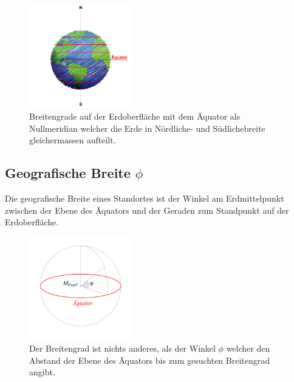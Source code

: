 \begin{refsection}
\begin{figure}[htbp]
\centering
\includegraphics[width=0.4\textwidth]{kugel/BreiteErdkugel.jpg}
\caption{Breitengrade auf der Erdoberfläche mit dem Äquator als Nullmeridian welcher die Erde in Nördliche- und Südlichebreite gleichermassen aufteilt.}
\end{figure}



\subsection{Geografische Breite $\phi$}
\begin{definition}
Die geografische Breite eines Standortes ist der Winkel am Erdmittelpunkt zwischen der Ebene des Äquators und der Geraden zum Standpunkt auf der Erdoberfläche.
\end{definition}

\begin{figure}[hbtp]
\centering
\includegraphics[width=0.4\textwidth]{kugel/GeografischeBreite.jpg}
\caption{Der Breitengrad ist nichts anderes, als der Winkel $\phi$ welcher den Abstand der Ebene des Äquators bis zum gesuchten Breitengrad angibt.}
\end{figure}


\end{refsection}
